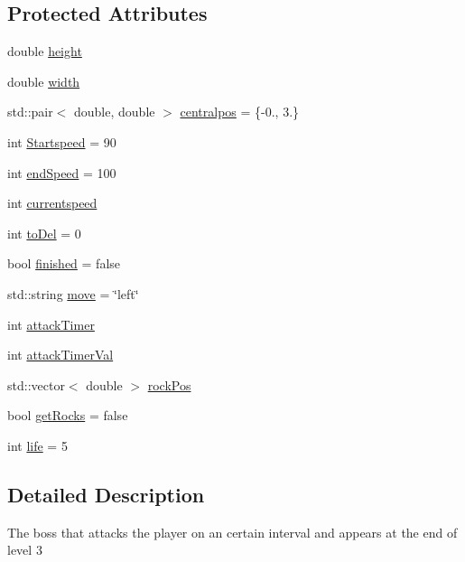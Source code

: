 \subsection*{Protected Attributes}
\begin{DoxyCompactItemize}
\item 
double \hyperlink{classroadfighter_1_1Boss_a6062969541b2838a1e9a1f6425bccac2}{height}
\item 
double \hyperlink{classroadfighter_1_1Boss_a963dd4050bb246ed954d5b7e46e8ce0b}{width}
\item 
std\+::pair$<$ double, double $>$ \hyperlink{classroadfighter_1_1Boss_af4e26d92a22d3a5234b873226d6d58f1}{centralpos} = \{-\/0., 3.\}
\item 
int \hyperlink{classroadfighter_1_1Boss_a2bf87a5fced53d631fb868466f8ecdc1}{Startspeed} = 90
\item 
int \hyperlink{classroadfighter_1_1Boss_a2ef927f59e984885871c60a954619bee}{end\+Speed} = 100
\item 
int \hyperlink{classroadfighter_1_1Boss_a028d0056530ced9a5a3ff76ea9a0d363}{currentspeed}
\item 
int \hyperlink{classroadfighter_1_1Boss_ac9f5ce0c9c356d6096357d48cb14bb5b}{to\+Del} = 0
\item 
bool \hyperlink{classroadfighter_1_1Boss_aa2897b0adae7882c58cce5f9c5e2081d}{finished} = false
\item 
std\+::string \hyperlink{classroadfighter_1_1Boss_af9b6459f0d385ca91da6f5d7141c2bff}{move} = \char`\"{}left\char`\"{}
\item 
int \hyperlink{classroadfighter_1_1Boss_ae8987be96a3b9f697f56e9c0a6552179}{attack\+Timer}
\item 
int \hyperlink{classroadfighter_1_1Boss_a7a6935ff79f30b83aaafbec647cb062f}{attack\+Timer\+Val}
\item 
std\+::vector$<$ double $>$ \hyperlink{classroadfighter_1_1Boss_abd5f1aee76cbfc0798a716c1f69b75d2}{rock\+Pos}
\item 
bool \hyperlink{classroadfighter_1_1Boss_a276f3388ae889d5b9e32e4e68ecd8e55}{get\+Rocks} = false
\item 
int \hyperlink{classroadfighter_1_1Boss_a176c004f982a1c1f75d18e980373bf61}{life} = 5
\end{DoxyCompactItemize}


\subsection{Detailed Description}
The boss that attacks the player on an certain interval and appears at the end of level 3 

